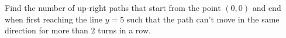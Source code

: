 Find the number of up-right paths that start from the point $(0,0)$ and end when first reaching the line $y=5$ such that the path can't move in the same direction for more than $2$ turns in a row.
